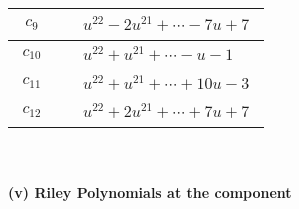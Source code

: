 \documentclass[1p]{elsarticle_modified}
\theoremstyle{definition}
\begin{document}
\begin{tabular}{m{50pt}|m{274pt}}
\hline $$\begin{aligned}c_{9}\end{aligned}$$&$\begin{aligned}
&u^{22}-2 u^{21}+\cdots-7 u+7
\end{aligned}$\\
\hline $$\begin{aligned}c_{10}\end{aligned}$$&$\begin{aligned}
&u^{22}+u^{21}+\cdots- u-1
\end{aligned}$\\
\hline $$\begin{aligned}c_{11}\end{aligned}$$&$\begin{aligned}
&u^{22}+u^{21}+\cdots+10 u-3
\end{aligned}$\\
\hline $$\begin{aligned}c_{12}\end{aligned}$$&$\begin{aligned}
&u^{22}+2 u^{21}+\cdots+7 u+7
\end{aligned}$\\
\hline
\end{tabular}\\~\\
\newpage\renewcommand{\arraystretch}{1}
\flushleft \textbf{(v) Riley Polynomials at the component}\newline \\
\end{document}
